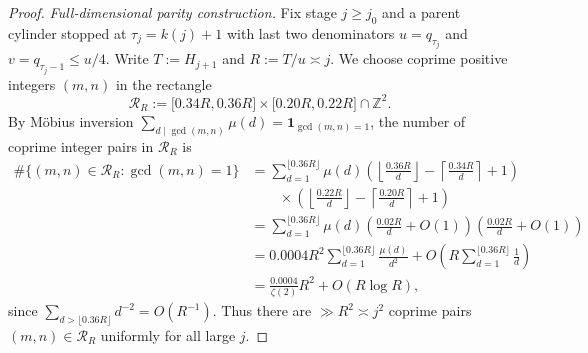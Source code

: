 \documentclass[11pt]{article}
\theoremstyle{definition}
\theoremstyle{remark}
\newcommand{\Z}{\mathbb{Z}}
\begin{document}
\begin{proof}
\emph{Full-dimensional parity construction.} Fix stage $j\ge j_0$ and a parent
cylinder stopped at $\tau_j=k(j)+1$ with last two denominators $u=q_{\tau_j}$
and $v=q_{\tau_j-1}\le u/4$. Write $T:=H_{j+1}$ and $R:=T/u\asymp j$. We choose
coprime positive integers $(m,n)$ in the rectangle
\[
\mathcal R_R:=\bigl[0.34R,0.36R\bigr]\times\bigl[0.20R,0.22R\bigr]\cap\Z^2.
\]
By M\"obius inversion $\sum_{d\mid\gcd(m,n)}\mu(d)=\mathbf 1_{\gcd(m,n)=1}$, the
number of coprime integer pairs in $\mathcal R_R$ is
\begin{align*}
\#\{(m,n)\in\mathcal R_R:\gcd(m,n)=1\}
&=\sum_{d=1}^{\lfloor0.36R\rfloor}\mu(d)
\left(\left\lfloor\frac{0.36R}{d}\right\rfloor-\left\lceil\frac{0.34R}{d}\right\rceil+1\right)\\
&\qquad\times\left(\left\lfloor\frac{0.22R}{d}\right\rfloor-\left\lceil\frac{0.20R}{d}\right\rceil+1\right)\\
&=\sum_{d=1}^{\lfloor0.36R\rfloor}\mu(d)
\left(\frac{0.02R}{d}+O(1)\right)\left(\frac{0.02R}{d}+O(1)\right)\\
&=0.0004R^2\sum_{d=1}^{\lfloor0.36R\rfloor}\frac{\mu(d)}{d^2}
+O\left(R\sum_{d=1}^{\lfloor0.36R\rfloor}\frac1d\right)\\
&=\frac{0.0004}{\zeta(2)}R^2+O(R\log R),
\end{align*}
since $\sum_{d>\lfloor0.36R\rfloor}d^{-2}=O(R^{-1})$. Thus there are $\gg R^2\asymp j^2$
coprime pairs $(m,n)\in\mathcal R_R$ uniformly for all large $j$.


\end{proof}
\end{document}
